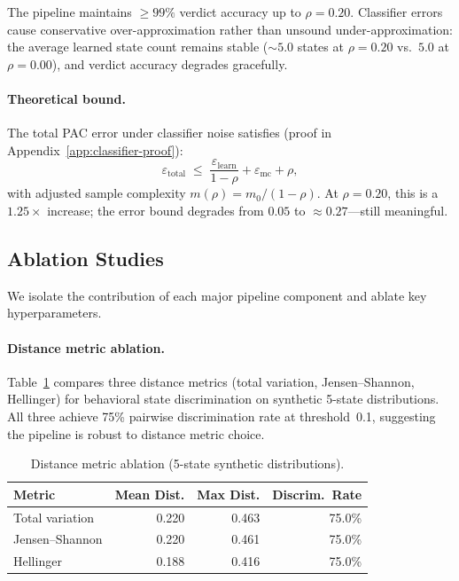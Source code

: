\documentclass[11pt]{article}
\begin{document}
The pipeline maintains $\ge 99\%$ verdict accuracy up to $\rho = 0.20$.
Classifier errors cause conservative over-approximation rather than
unsound under-approximation: the average learned state count remains
stable (${\sim}5.0$ states at $\rho{=}0.20$ vs.\ $5.0$ at
$\rho{=}0.00$), and verdict accuracy degrades gracefully.

\paragraph{Theoretical bound.}
The total PAC error under classifier noise satisfies
(proof in Appendix~\ref{app:classifier-proof}):
\begin{equation}\label{eq:classifier_bound}
\varepsilon_{\mathrm{total}} \;\le\;
  \frac{\varepsilon_{\mathrm{learn}}}{1 - \rho}
  + \varepsilon_{\mathrm{mc}} + \rho,
\end{equation}
with adjusted sample complexity $m(\rho) = m_0 / (1{-}\rho)$.
At $\rho = 0.20$, this is a $1.25\times$ increase; the error bound
degrades from $0.05$ to ${\approx}0.27$---still meaningful.

\subsection{Ablation Studies}\label{sec:ablation}

We isolate the contribution of each major pipeline component and
ablate key hyperparameters.

\paragraph{Distance metric ablation.}
Table~\ref{tab:dist-ablation} compares three distance metrics
(total variation, Jensen--Shannon, Hellinger) for behavioral state
discrimination on synthetic 5-state distributions.  All three
achieve 75\% pairwise discrimination rate at threshold~0.1,
suggesting the pipeline is robust to distance metric choice.

\begin{table}[t]
\centering
\caption{Distance metric ablation (5-state synthetic distributions).}
\label{tab:dist-ablation}
\small
\begin{tabular}{@{}lrrr@{}}
\toprule
\textbf{Metric} & \textbf{Mean Dist.} & \textbf{Max Dist.} & \textbf{Discrim.\ Rate} \\
\midrule
Total variation  & 0.220 & 0.463 & 75.0\% \\
Jensen--Shannon  & 0.220 & 0.461 & 75.0\% \\
Hellinger        & 0.188 & 0.416 & 75.0\% \\
\bottomrule
\end{tabular}
\end{table}
\end{document}
